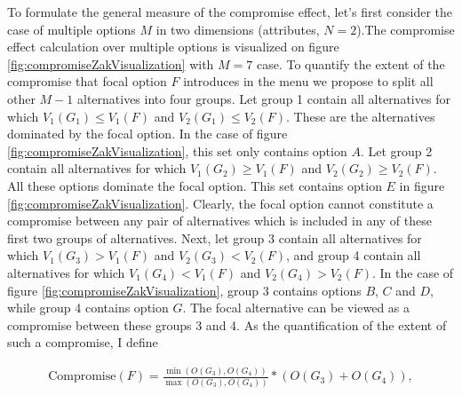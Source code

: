 \documentclass[a4paper,12pt]{article}
\begin{document}
To formulate the general measure of the compromise effect, let's first consider the case of multiple options $M$ in two dimensions (attributes, $N = 2$).The compromise effect  calculation over multiple options is visualized on figure \ref{fig:compromiseZakVisualization} with $M = 7$ case. To quantify the extent of the compromise that focal option $F$ introduces in the menu we propose to split all other $M - 1$ alternatives into four groups. Let group 1 contain all alternatives for which $V_1(G_1 ) \le V_1(F)$ and $V_2(G_1 ) \le V_2(F)$. These are the alternatives dominated by the focal option. In the case of figure \ref{fig:compromiseZakVisualization}, this set only contains option $A$. Let group 2 contain all alternatives for which $V_1(G_2 ) \ge V_1(F)$ and $V_2(G_2 ) \ge V_2(F)$. All these options dominate the focal option. This set contains option $E$ in figure \ref{fig:compromiseZakVisualization}. Clearly, the focal option cannot constitute a compromise between any pair of alternatives which is included in any of these first two groups of alternatives. Next, let group 3 contain all alternatives for which $V_1(G_3 ) > V_1(F)$ and $V_2(G_3 ) < V_2(F)$, and group 4 contain all alternatives for which $V_1(G_4 ) < V_1(F)$ and $V_2(G_4 ) > V_2(F)$. In the case of figure \ref{fig:compromiseZakVisualization}, group 3 contains options $B$, $C$ and $D$, while group 4 contains option $G$. The focal alternative can be viewed as a compromise between these groups 3 and 4. As the quantification of the extent of such a compromise, I define

\begin{align}\label{}
    \text{Compromise}(F) = \frac{\min(O(G_3), O(G_4))}{\max(O(G_3), O(G_4))} * (O(G_3) + O(G_4)) ,
\end{align}
\end{document}
